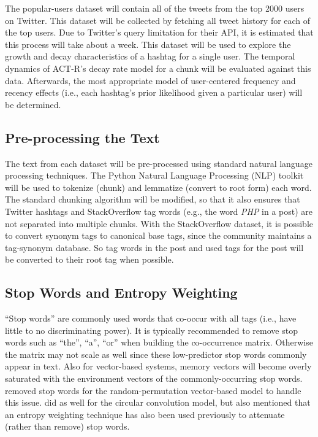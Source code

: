 \documentclass[man,floatsintext,donotrepeattitle]{apa6}
\begin{document}
The popular-users dataset will contain all of the tweets from the top \num{2000} users on Twitter.
This dataset will be collected by fetching all tweet history for each of the top users.
Due to Twitter's query limitation for their API, it is estimated that this process will take about a week.
This dataset will be used to explore the growth and decay characteristics of a hashtag for a single user.
The temporal dynamics of ACT-R's decay rate model for a chunk will be evaluated against this data.
Afterwards, the most appropriate model of user-centered frequency and recency effects (i.e., each hashtag's prior likelihood given a particular user) will be determined.

\subsection{Pre-processing the Text}

The text from each dataset will be pre-processed using standard natural language processing techniques.
The Python Natural Language Processing (NLP) toolkit \parencite{Bird2009} will be used to tokenize (chunk) and lemmatize (convert to root form) each word.
The standard chunking algorithm will be modified, so that it also ensures that Twitter hashtags and StackOverflow tag words (e.g., the word \emph{PHP} in a post) are not separated into multiple chunks.
With the StackOverflow dataset, it is possible to convert synonym tags to canonical base tags, since the community maintains a tag-synonym database.
So tag words in the post and used tags for the post will be converted to their root tag when possible.

\subsection{Stop Words and Entropy Weighting}

``Stop words'' are commonly used words that co-occur with all tags (i.e., have little to no discriminating power).
It is typically recommended \parencite{Bird2009} to remove stop words such as ``the'', ``a'', ``or'' when building the co-occurrence matrix.
Otherwise the matrix may not scale as well since these low-predictor stop words commonly appear in text.
Also for vector-based systems, memory vectors will become overly saturated with the environment vectors of the commonly-occurring stop words.
\textcite{Sahlgren2008} removed stop words for the random-permutation vector-based model to handle this issue.
\textcite{Jones2007} did as well for the circular convolution model, but also mentioned that an entropy weighting technique has also been used previously to attenuate (rather than remove) stop words.
\end{document}
